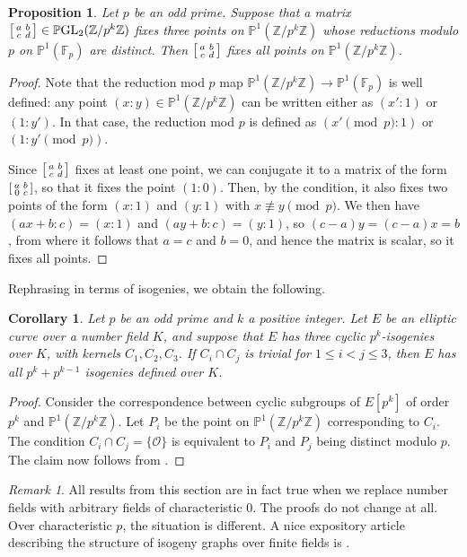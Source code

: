\documentclass[10pt,leqno]{amsart}
\newcommand\sm[1]{\begin{bsmallmatrix}#1\end{bsmallmatrix}}
\newcommand{\Z}{\mathbb{Z}}
\newcommand{\F}{\mathbb{F}}
\newcommand{\PP}{\mathbb{P}}
\newcommand{\GL}{\textnormal{GL}}
\newtheorem{proposition}[theorem]{Proposition}
\newtheorem{corollary}[theorem]{Corollary}
\theoremstyle{definition}
\theoremstyle{remark}
\newtheorem{remark}[theorem]{Remark}
\numberwithin{theorem}{section}
\begin{document}
\begin{proposition}\label{ako 3 onda sve}
Let $p$ be an odd prime. Suppose that a matrix $\sm{a & b \\ c & d}\in \PP \GL_2(\Z/p^k\Z)$ fixes three points on $\PP^1(\Z/p^k\Z)$ whose reductions modulo $p$ on $\PP^1(\F_p)$ are distinct. Then $\sm{a & b \\ c & d}$ fixes all points on $\PP^1(\Z/p^k\Z)$.    
\end{proposition}
\begin{proof}
    Note that the reduction mod $p$ map $\PP^1(\Z/p^k\Z)\to \PP^1(\F_p)$ is well defined: any point $(x:y)\in \PP^1(\Z/p^k\Z)$ can be written either as $(x':1)$ or $(1:y')$. In that case, the reduction mod $p$ is defined as $(x' \pmod p:1)$ or $(1:y' \pmod p)$.

    Since $\sm{a & b \\ c & d}$ fixes at least one point, we can conjugate it to a matrix of the form $\sm{a & b \\ 0 & c}$, so that it fixes the point $(1:0)$. Then, by the condition, it also fixes two points of the form $(x:1)$ and $(y:1)$ with $x\not \equiv y \pmod p$. We then have $(ax+b:c)=(x:1)$ and $(ay+b:c)=(y:1)$, so $(c-a)y=(c-a)x=b$, from where it follows that $a=c$ and $b=0$, and hence the matrix is scalar, so it fixes all points.
\end{proof}
Rephrasing in terms of isogenies, we obtain the following.
\begin{corollary}
    Let $p$ be an odd prime and $k$ a positive integer. Let $E$ be an elliptic curve over a number field $K$, and suppose that $E$ has three cyclic $p^k$-isogenies over $K$, with kernels $C_1, C_2, C_3$. If $C_i \cap C_j$ is trivial for $1\leq i<j\leq 3$, then $E$ has all $p^k+p^{k-1}$ isogenies defined over $K$.
\end{corollary}
\begin{proof}
    Consider the correspondence between cyclic subgroups of $E[p^k]$ of order $p^k$ and $\PP^1(\Z/ p^k\Z)$. Let $P_i$ be the point on $\PP^1(\Z/p^k\Z)$ corresponding to $C_i$. The condition $C_i \cap C_j=\{\mathcal O\}$ is equivalent to $P_i$ and $P_j$ being distinct modulo $p$. The claim now follows from .
\end{proof}

\begin{remark}
    All results from this section are in fact true when we replace number fields with arbitrary fields of characteristic $0$. The proofs do not change at all. Over characteristic $p$, the situation is different. A nice expository article describing the structure of isogeny graphs over finite fields is \cite{volcanoes}.
\end{remark}
\end{document}
